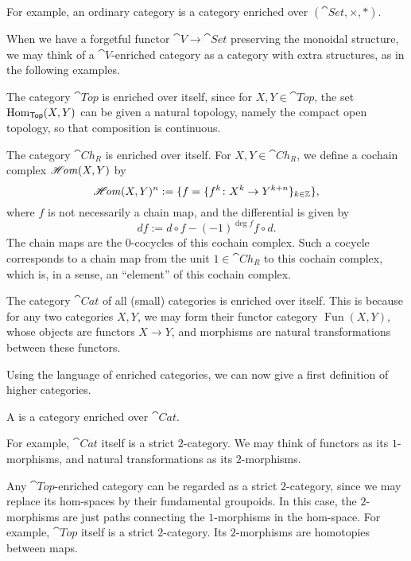 For example,
an ordinary category is a category
enriched over $(\cat{Set},\times,*)$.

When we have a forgetful functor $\cat V\to\cat{Set}$
preserving the monoidal structure,
we may think of a $\cat V$-enriched category
as a category with extra structures,
as in the following examples.

\begin{example}
    The category $\cat{Top}$ is enriched over itself,
    since for $X,Y\in\cat{Top}$,
    the set $\operatorname{Hom}_{\textup{\textsf{Top}}}(X,Y)$ can be given a natural topology,
    namely the compact open topology,
    so that composition is continuous. \varqed
\end{example}

\begin{example}\label{eg-1-c}
    The category $\cat{Ch}_R$ is enriched over itself.
    For $X,Y\in\cat{Ch}_R$, we define a cochain complex $\mathscr{H}\mkern-3mu\mathit{om}(X,Y)$ by
    \[ \mathscr{H}\mkern-3mu\mathit{om}(X,Y)^n:=\{f=\{f^k\colon X^k\to Y^{k+n}\}_{k\in\mathbb Z}\}, \]
    where $f$ is not necessarily a chain map,
    and the differential is given by
    \[ df:=d\circ f-(-1)^{\deg f}f\circ d. \]
    The chain maps are the $0$-cocycles of this cochain complex.
    Such a cocycle corresponds to a chain map
    from the unit $1\in\cat{Ch}_R$ to this cochain complex, which is,
    in a sense, an ``element'' of this cochain complex. \varqed
\end{example}

\begin{example}
    The category $\cat{Cat}$ of all (small) categories
    is enriched over itself.
    This is because for any two categories $X,Y$,
    we may form their functor category $\operatorname{Fun}(X,Y)$,
    whose objects are functors $X\to Y$,
    and morphisms are natural transformations between these functors. \varqed
\end{example}

Using the language of enriched categories,
we can now give a first definition of higher categories.

\begin{definition}
    A  is a category enriched over $\cat{Cat}$.
\end{definition}

For example, $\cat{Cat}$ itself is a strict $2$-category.
We may think of functors as its $1$-morphisms,
and natural transformations as its $2$-morphisms.

Any $\cat{Top}$-enriched category can be regarded as a
strict $2$-category,
since we may replace its hom-spaces by
their fundamental groupoids.
In this case, the $2$-morphisms are just
paths connecting the $1$-morphisms in the hom-space.
For example, $\cat{Top}$ itself is a strict $2$-category.
Its $2$-morphisms are homotopies between maps.

